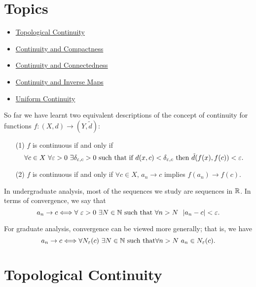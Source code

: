 \documentclass[a4paper]{article}
\begin{document}
\section{Topics}

\begin{itemize}
    \item {\hyperref[Topological Continuity]{Topological Continuity}}
    \item {\hyperref[Continuity and Compactness]{Continuity and Compactness}}
    \item {\hyperref[Continuity and Connectedness]{Continuity and Connectedness}} 
    \item {\hyperref[Continuity and Inverse Maps]{Continuity and Inverse Maps}}
    \item {\hyperref[Uniform Continuity]{Uniform Continuity}}
\end{itemize}

So far we have learnt two equivalent descriptions of the concept of continuity for functions \( f: (X,d) \to (Y,\tilde{d}) \):
\begin{enumerate}
    \item[(1)] \( f \) is continuous if and only if 
        \[  \text{\( \forall c \in X  \) \( \forall \epsilon > 0  \) \( \exists \delta_{\epsilon,c} > 0 \) such that if \( d(x,c) < \delta_{\epsilon, c} \) then \( \tilde{d}(f(x), f(c)) < \epsilon \)}. \]
    \item[(2)] \( f  \) is continuous if and only if \( \forall c \in X  \), \( {a}_{n} \to c  \) implies \( f({a}_{n}) \to f(c) \).
\end{enumerate}

In undergraduate analysis, most of the sequences we study are sequences in \( \R  \). In terms of convergence, we say that 
\[  {a}_{n} \to c \iff \forall \ \epsilon > 0 \ \exists N \in \N \ \text{such that} \ \forall n > N \ \ | {a}_{n} - c  |  < \epsilon. \]

For graduate analysis, convergence can be viewed more generally; that is, we have
\[  {a}_{n} \to c \iff \forall {N}_{\epsilon}(c) \ \exists N \in \N \ \text{such that} \forall n > N \ {a}_{n} \in {N}_{\epsilon}(c). \]

\section{Topological Continuity}\label{Topological Continuity}
\end{document}

